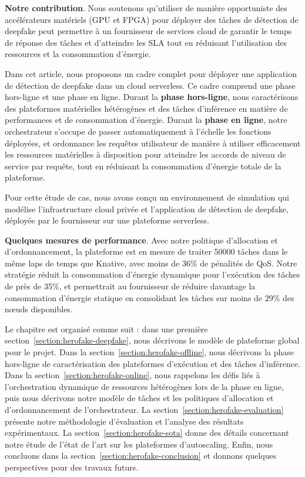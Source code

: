 \textbf{Notre contribution}. Nous soutenons qu'utiliser de manière opportuniste des accélérateurs matériels (GPU et FPGA) pour déployer des tâches de détection de deepfake peut permettre à un fournisseur de services cloud de garantir le temps de réponse des tâches et d'atteindre les SLA tout en réduisant l'utilisation des ressources et la consommation d'énergie.

Dans cet article, nous proposons un cadre complet pour déployer une application de détection de deepfake dans un cloud serverless. Ce cadre comprend une phase hors-ligne et une phase en ligne. Durant la \textbf{phase hors-ligne}, nous caractérisons des plateformes matérielles hétérogènes et des tâches d'inférence en matière de performances et de consommation d'énergie. Durant la \textbf{phase en ligne}, notre orchestrateur s'occupe de passer automatiquement à l'échelle les fonctions déployées, et ordonnance les requêtes utilisateur de manière à utiliser efficacement les ressources matérielles à disposition pour atteindre les accords de niveau de service par requête, tout en réduisant la consommation d'énergie totale de la plateforme.

Pour cette étude de cas, nous avons conçu un environnement de simulation qui modélise l'infrastructure cloud privée et l'application de détection de deepfake, déployée par le fournisseur sur une plateforme serverless.

\textbf{Quelques mesures de performance}. Avec notre politique d'allocation et d'ordonnancement, la plateforme est en mesure de traiter 50000 tâches dans le même laps de temps que Knative, avec moins de 36\% de pénalités de QoS. Notre stratégie réduit la consommation d'énergie dynamique pour l'exécution des tâches de près de 35\%, et permettrait au fournisseur de réduire davantage la consommation d'énergie statique en consolidant les tâches sur moins de 29\% des nœuds disponibles.

Le chapitre est organisé comme suit : dans une première section~\ref{section:herofake-deepfake}, nous décrivons le modèle de plateforme global pour le projet. Dans la section~\ref{section:herofake-offline}, nous décrivons la phase hors-ligne de caractérisation des plateformes d'exécution et des tâches d'inférence. Dans la section~\ref{section:herofake-online}, nous rappelons les défis liés à l'orchestration dynamique de ressources hétérogènes lors de la phase en ligne, puis nous décrivons notre modèle de tâches et les politiques d'allocation et d'ordonnancement de l'orchestrateur. La section~\ref{section:herofake-evaluation} présente notre méthodologie d'évaluation et l'analyse des résultats expérimentaux. La section~\ref{section:herofake-sota} donne des détails concernant notre étude de l'état de l'art sur les plateformes d'autoscaling. Enfin, nous concluons dans la section~\ref{section:herofake-conclusion} et donnons quelques perspectives pour des travaux futurs.

